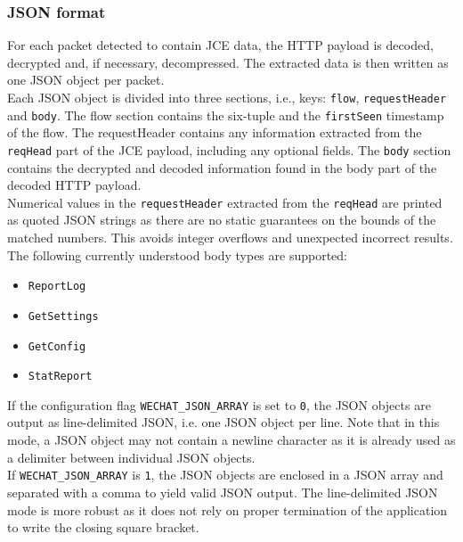 \documentclass[documentation]{subfiles}
\begin{document}
\subsubsection{JSON format}

For each packet detected to contain JCE data, the HTTP payload is decoded, decrypted and, if necessary, decompressed. The extracted data is then written as one JSON object per packet.\\

Each JSON object is divided into three sections, i.e., keys: {\tt flow}, {\tt requestHeader} and {\tt body}. The flow section contains the six-tuple and the {\tt firstSeen} timestamp of the flow. The requestHeader contains any information extracted from the {\tt reqHead} part of the JCE payload, including any optional fields. The {\tt body} section contains the decrypted and decoded information found in the body part of the decoded HTTP payload.\\

Numerical values in the {\tt requestHeader} extracted from the {\tt reqHead} are printed as quoted JSON strings as there are no static guarantees on the bounds of the matched numbers. This avoids integer overflows and unexpected incorrect results.\\

The following currently understood body types are supported:

\begin{itemize}
    \item {\tt ReportLog}
    \item {\tt GetSettings}
    \item {\tt GetConfig}
    \item {\tt StatReport}
\end{itemize}

If the configuration flag {\tt WECHAT\_JSON\_ARRAY} is set to {\tt 0}, the JSON objects are output as line-delimited JSON, i.e. one JSON object per line. Note that in this mode, a JSON object may not contain a newline character as it is already used as a delimiter between individual JSON objects.\\

If {\tt WECHAT\_JSON\_ARRAY} is {\tt 1}, the JSON objects are enclosed in a JSON array and separated with a comma to yield valid JSON output. The line-delimited JSON mode is more robust as it does not rely on proper termination of the application to write the closing square bracket.
\end{document}
